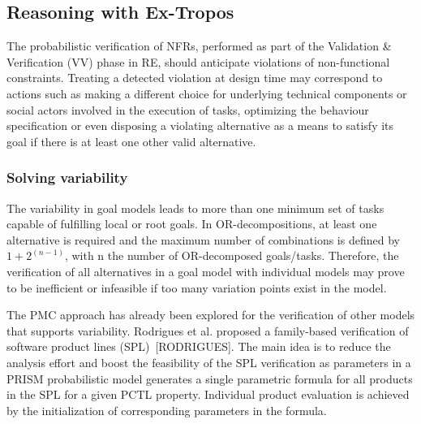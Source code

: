 
\subsection{Reasoning with Ex-Tropos}

The probabilistic verification of NFRs, performed as part of the Validation \& Verification (VV) phase in RE, should anticipate violations of non-functional constraints. Treating a detected violation at design time may correspond to actions such as making a different choice for underlying technical components or social actors involved in the execution of tasks, optimizing the behaviour specification or even disposing a violating alternative as a means to satisfy its goal if there is at least one other valid alternative. 


\subsubsection{Solving variability}

The variability in goal models leads to more than one minimum set of tasks capable of fulfilling local or root goals. In OR-decompositions, at least one alternative is required and the maximum number of combinations is defined by $1 + 2^{(n-1)}$, with n the number of OR-decomposed goals/tasks. Therefore, the verification of all alternatives in a goal model with individual models may prove to be inefficient or infeasible if too many variation points exist in the model.

The PMC approach has already been explored for the verification of other models that supports variability. Rodrigues et al. proposed a family-based verification of software product lines (SPL)~[RODRIGUES]. The main idea is to reduce the analysis effort and boost the feasibility of the SPL verification as parameters in a PRISM probabilistic model generates a single parametric formula for all products in the SPL for a given PCTL property. Individual product evaluation is achieved by the initialization of corresponding parameters in the formula. 

